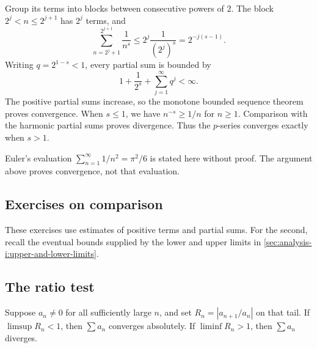 Group its terms into blocks between consecutive powers of $2$.
The block $2^j<n\le2^{j+1}$ has $2^j$ terms, and
\[
  \sum_{n=2^j+1}^{2^{j+1}}\frac{1}{n^s}
  \le 2^j\frac{1}{(2^j)^s}=2^{-j(s-1)}.
\]
Writing $q=2^{1-s}<1$, every partial sum is bounded by
\[
  1+\frac{1}{2^s}+\sum_{j=1}^{\infty}q^j<\infty.
\]
The positive partial sums increase, so the monotone bounded sequence
theorem proves convergence. When $s\le1$, we have $n^{-s}\ge1/n$
for $n\ge1$. Comparison with the harmonic partial sums proves
divergence. Thus the $p$-series converges exactly when $s>1$.

Euler's evaluation $\sum_{n=1}^{\infty}1/n^2=\pi^2/6$ is stated
here without proof.
The argument above proves convergence, not that evaluation.

\subsection{Exercises on comparison}

These exercises use estimates of positive terms and partial sums.
For the second, recall the eventual bounds supplied by the lower and
upper limits in \autoref{sec:analysis-i:upper-and-lower-limits}.




\subsection{The ratio test}

\begin{theorem}
  \label{thm:analysis-i:ratio-test}
  Suppose $a_n\ne0$ for all sufficiently large $n$, and set
  $R_n=|a_{n+1}/a_n|$ on that tail.
  If $\limsup R_n<1$, then $\sum a_n$ converges absolutely.
  If $\liminf R_n>1$, then $\sum a_n$ diverges.
\end{theorem}


